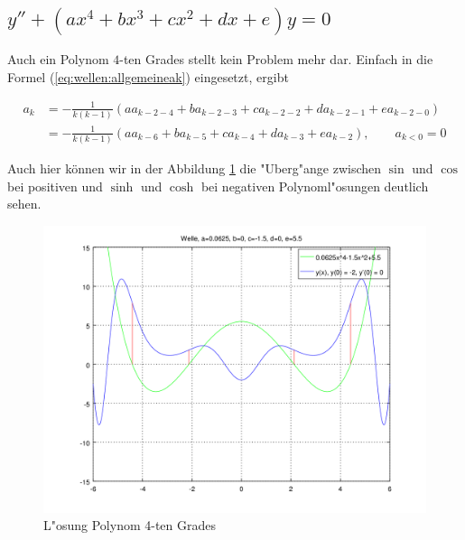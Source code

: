 \subsection{\texorpdfstring{$y''+(ax^4+bx^3+cx^2+dx+e)y = 
0$}{y''-(ax4+bx3+cx2+dx+e)y = 0}}

Auch ein Polynom $4$-ten Grades stellt kein Problem mehr dar. Einfach in die 
Formel (\ref{eq:wellen:allgemeineak}) eingesetzt, ergibt

\begin{equation*}
	\begin{split}
		a_k &= -\frac{1}{k(k-1)} (aa_{k-2-4} + 
		ba_{k-2-3} + ca_{k-2-2} + da_{k-2-1} +ea_{k-2-0})
		\\
		&= -\frac{1}{k(k-1)} (aa_{k-6} + ba_{k-5} + 
		ca_{k-4} + da_{k-3} +ea_{k-2}), \qquad a_{k<0} = 0
	\end{split}
\end{equation*}

Auch hier können wir in der Abbildung \ref{fig:wellen:poly4-dgl} die 
"Uberg"ange zwischen $\sin$ und $\cos$ bei positiven und $\sinh$ und $\cosh$ 
bei negativen Polynoml"osungen deutlich sehen.

\begin{figure}
	\includegraphics[scale=0.65]{./wellen/images/allgemein/n4.png}
	\caption{L"osung Polynom 4-ten Grades}
	\label{fig:wellen:poly4-dgl}
\end{figure}